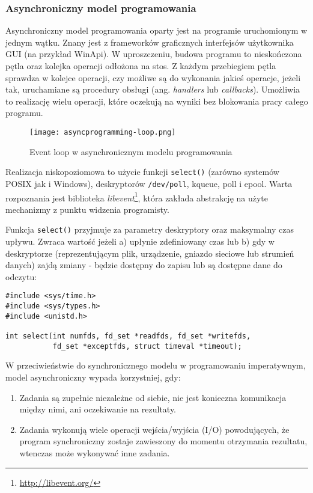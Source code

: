 \subsubsection{Asynchroniczny model programowania}
\label{subsub:asyncprogramming}

Asynchroniczny model programowania oparty jest na programie uruchomionym w jednym wątku. Znany jest z frameworków graficznych interfejsów użytkownika GUI (na przykład WinApi). W uproszczeniu, budowa programu to nieskończona pętla oraz kolejka operacji odłożona na stos. Z każdym przebiegiem pętla sprawdza w kolejce operacji, czy możliwe są do wykonania jakieś operacje, jeżeli tak, uruchamiane są procedury obsługi (ang. \emph{handlers} lub \emph{callbacks}). Umożliwia to realizację wielu operacji, które oczekują na wyniki bez blokowania pracy całego programu.

\begin{figure}[H]
  \caption[Event loop w asynchronicznym modelu programowania]{Event loop w asynchronicznym modelu programowania}
  \centering
    \texttt{[image: asyncprogramming-loop.png]}
\end{figure}

Realizacja niskopoziomowa to użycie funkcji \lstinline{select()} (zarówno systemów POSIX jak i Windows), deskryptorów \lstinline{/dev/poll}, kqueue, poll i epool. Warta rozpoznania jest biblioteka \emph{libevent}\footnote{\url{http://libevent.org/}}, która zakłada abstrakcję na użyte mechanizmy z punktu widzenia programisty\cite{programming-async-sockets}.

Funkcja \lstinline{select()} przyjmuje za parametry deskryptory oraz maksymalny czas upływu. Zwraca wartość jeżeli a) upłynie zdefiniowany czas lub b) gdy w deskryptorze (reprezentującym plik, urządzenie, gniazdo sieciowe lub strumień danych) zajdą zmiany - będzie dostępny do zapisu lub są dostępne dane do odczytu:

\lstset{language=C}
\begin{lstlisting}
#include <sys/time.h>
#include <sys/types.h>
#include <unistd.h>

int select(int numfds, fd_set *readfds, fd_set *writefds,
           fd_set *exceptfds, struct timeval *timeout);
\end{lstlisting}

W przeciwieństwie do synchronicznego modelu w programowaniu imperatywnym, model asynchroniczny wypada korzystniej, gdy\cite{programming-async}:

\begin{enumerate}
  \item Zadania są zupełnie niezależne od siebie, nie jest konieczna komunikacja między nimi, ani oczekiwanie na rezultaty.
  \item Zadania wykonują wiele operacji wejścia/wyjścia (I/O) powodujących, że program synchroniczny zostaje zawieszony do momentu otrzymania rezultatu, wtenczas może wykonywać inne zadania.
\end{enumerate}

